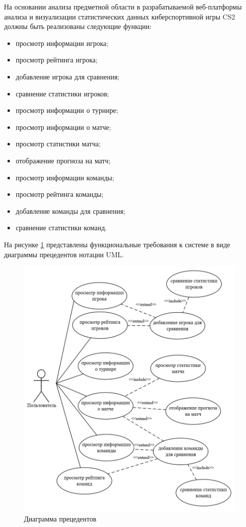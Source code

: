 На основании анализа предметной области в разрабатываемой веб-платформы анализа и визуализации статистических данных киберспортивной игры CS2 должны быть реализованы следующие функции:
\begin{itemize}
	\item просмотр информации игрока;
	\item просмотр рейтинга игрока;
	\item добавление игрока для сравнения;
	\item сравнение статистики игроков;
	\item просмотр информации о турнире;
	\item просмотр информации о матче;
	\item просмотр статистики матча;
	\item отображение прогноза на матч;
	\item просмотр информации команды;
	\item просмотр рейтинга команды;
	\item добавление команды для сравнения;
	\item сравнение статистики команд.
\end{itemize}

На рисунке \ref{fig:-use_case_diagram} представлены функциональные требования к системе в виде диаграммы прецедентов нотации UML.
\begin{figure}
	\centering
	\includegraphics[width=0.9\linewidth]{"images/Диаграмма прецедентов"}
	\caption{Диаграмма прецедентов}
	\label{fig:-use_case_diagram}
\end{figure}

